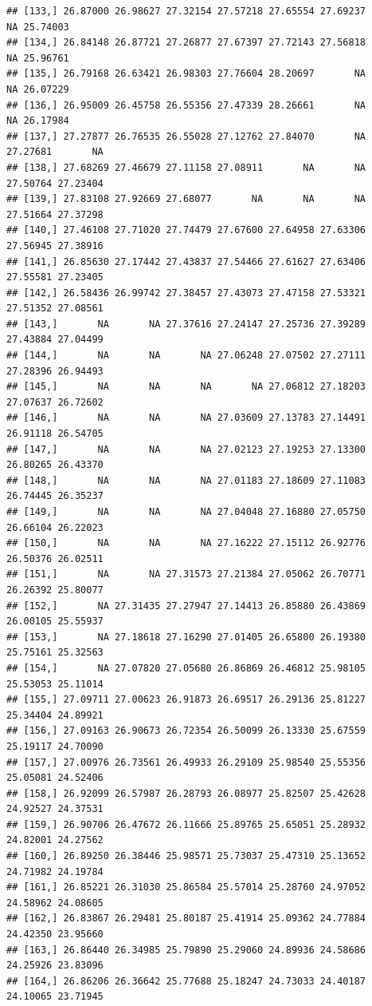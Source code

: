\documentclass{article}\usepackage[]{graphicx}\usepackage[]{color}
\makeatletter
\newenvironment{kframe}{%
 \def\at@end@of@kframe{}%
 \ifinner\ifhmode%
  \def\at@end@of@kframe{\end{minipage}}%
  \begin{minipage}{\columnwidth}%
 \fi\fi%
 \def\FrameCommand##1{\hskip\@totalleftmargin \hskip-\fboxsep
 \colorbox{shadecolor}{##1}\hskip-\fboxsep
     \hskip-\linewidth \hskip-\@totalleftmargin \hskip\columnwidth}%
 \MakeFramed {\advance\hsize-\width
   \@totalleftmargin\z@ \linewidth\hsize
   \@setminipage}}%
 {\par\unskip\endMakeFramed%
 \at@end@of@kframe}
\newenvironment{knitrout}{}{} %
\makeatother
\begin{document}
\begin{knitrout}
\begin{kframe}
\begin{verbatim}
## [133,] 26.87000 26.98627 27.32154 27.57218 27.65554 27.69237       NA 25.74003
## [134,] 26.84148 26.87721 27.26877 27.67397 27.72143 27.56818       NA 25.96761
## [135,] 26.79168 26.63421 26.98303 27.76604 28.20697       NA       NA 26.07229
## [136,] 26.95009 26.45758 26.55356 27.47339 28.26661       NA       NA 26.17984
## [137,] 27.27877 26.76535 26.55028 27.12762 27.84070       NA 27.27681       NA
## [138,] 27.68269 27.46679 27.11158 27.08911       NA       NA 27.50764 27.23404
## [139,] 27.83108 27.92669 27.68077       NA       NA       NA 27.51664 27.37298
## [140,] 27.46108 27.71020 27.74479 27.67600 27.64958 27.63306 27.56945 27.38916
## [141,] 26.85630 27.17442 27.43837 27.54466 27.61627 27.63406 27.55581 27.23405
## [142,] 26.58436 26.99742 27.38457 27.43073 27.47158 27.53321 27.51352 27.08561
## [143,]       NA       NA 27.37616 27.24147 27.25736 27.39289 27.43884 27.04499
## [144,]       NA       NA       NA 27.06248 27.07502 27.27111 27.28396 26.94493
## [145,]       NA       NA       NA       NA 27.06812 27.18203 27.07637 26.72602
## [146,]       NA       NA       NA 27.03609 27.13783 27.14491 26.91118 26.54705
## [147,]       NA       NA       NA 27.02123 27.19253 27.13300 26.80265 26.43370
## [148,]       NA       NA       NA 27.01183 27.18609 27.11083 26.74445 26.35237
## [149,]       NA       NA       NA 27.04048 27.16880 27.05750 26.66104 26.22023
## [150,]       NA       NA       NA 27.16222 27.15112 26.92776 26.50376 26.02511
## [151,]       NA       NA 27.31573 27.21384 27.05062 26.70771 26.26392 25.80077
## [152,]       NA 27.31435 27.27947 27.14413 26.85880 26.43869 26.00105 25.55937
## [153,]       NA 27.18618 27.16290 27.01405 26.65800 26.19380 25.75161 25.32563
## [154,]       NA 27.07820 27.05680 26.86869 26.46812 25.98105 25.53053 25.11014
## [155,] 27.09711 27.00623 26.91873 26.69517 26.29136 25.81227 25.34404 24.89921
## [156,] 27.09163 26.90673 26.72354 26.50099 26.13330 25.67559 25.19117 24.70090
## [157,] 27.00976 26.73561 26.49933 26.29109 25.98540 25.55356 25.05081 24.52406
## [158,] 26.92099 26.57987 26.28793 26.08977 25.82507 25.42628 24.92527 24.37531
## [159,] 26.90706 26.47672 26.11666 25.89765 25.65051 25.28932 24.82001 24.27562
## [160,] 26.89250 26.38446 25.98571 25.73037 25.47310 25.13652 24.71982 24.19784
## [161,] 26.85221 26.31030 25.86584 25.57014 25.28760 24.97052 24.58962 24.08605
## [162,] 26.83867 26.29481 25.80187 25.41914 25.09362 24.77884 24.42350 23.95660
## [163,] 26.86440 26.34985 25.79890 25.29060 24.89936 24.58686 24.25926 23.83096
## [164,] 26.86206 26.36642 25.77688 25.18247 24.73033 24.40187 24.10065 23.71945

\end{verbatim}
\end{kframe}
\end{knitrout}
\end{document}
